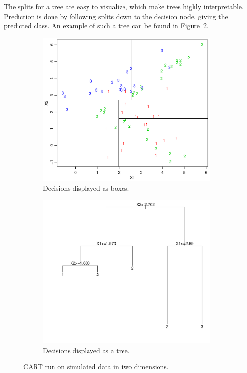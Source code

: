The splits for a tree are easy to visualize, which make trees highly interpretable. Prediction is done by following splits down to the decision node, giving the predicted class. An example of such a tree can be found in Figure~\ref{fig:cartTree1}.
\\
\begin{figure}[htbp]
  \centering
  \begin{subfigure}[b]{0.48\textwidth}
    \includegraphics[width=\textwidth]{./figures/cartAreas1.pdf}
    \caption{Decisions displayed as boxes.}
    \label{fig:cartAreas1}
  \end{subfigure}%
  \quad
  \begin{subfigure}[b]{0.48\textwidth}
    \includegraphics[width=\textwidth]{./figures/cartTree1.pdf}
    \caption{Decisions displayed as a tree.}
    \label{fig:cartTree1}
  \end{subfigure}
  \vspace{1\baselineskip}
  \caption{CART run on simulated data in two dimensions. }
  \label{fig:cart}
\end{figure}
